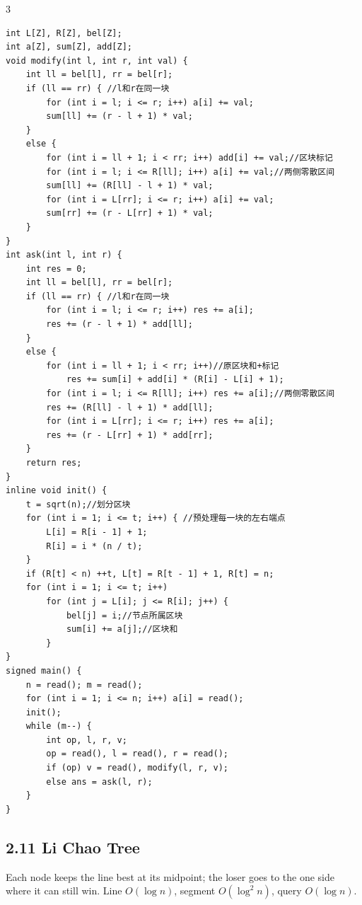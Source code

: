 \documentclass[8pt]{extarticle}
\begin{document}
\begin{multicols*}{3}
\begin{lstlisting}
int L[Z], R[Z], bel[Z];
int a[Z], sum[Z], add[Z];
void modify(int l, int r, int val) {
    int ll = bel[l], rr = bel[r];
    if (ll == rr) { //l和r在同一块
        for (int i = l; i <= r; i++) a[i] += val;
        sum[ll] += (r - l + 1) * val;
    }
    else {
        for (int i = ll + 1; i < rr; i++) add[i] += val;//区块标记
        for (int i = l; i <= R[ll]; i++) a[i] += val;//两侧零散区间
        sum[ll] += (R[ll] - l + 1) * val;
        for (int i = L[rr]; i <= r; i++) a[i] += val;
        sum[rr] += (r - L[rr] + 1) * val;
    }
}
int ask(int l, int r) {
    int res = 0;
    int ll = bel[l], rr = bel[r];
    if (ll == rr) { //l和r在同一块
        for (int i = l; i <= r; i++) res += a[i];
        res += (r - l + 1) * add[ll];
    }
    else {
        for (int i = ll + 1; i < rr; i++)//原区块和+标记
            res += sum[i] + add[i] * (R[i] - L[i] + 1);
        for (int i = l; i <= R[ll]; i++) res += a[i];//两侧零散区间
        res += (R[ll] - l + 1) * add[ll];
        for (int i = L[rr]; i <= r; i++) res += a[i];
        res += (r - L[rr] + 1) * add[rr];
    }
    return res;
}
inline void init() {
    t = sqrt(n);//划分区块
    for (int i = 1; i <= t; i++) { //预处理每一块的左右端点
        L[i] = R[i - 1] + 1;
        R[i] = i * (n / t);
    }
    if (R[t] < n) ++t, L[t] = R[t - 1] + 1, R[t] = n;
    for (int i = 1; i <= t; i++)
        for (int j = L[i]; j <= R[i]; j++) {
            bel[j] = i;//节点所属区块
            sum[i] += a[j];//区块和
        }
}
signed main() {
    n = read(); m = read();
    for (int i = 1; i <= n; i++) a[i] = read();
    init();
    while (m--) {
        int op, l, r, v;
        op = read(), l = read(), r = read();
        if (op) v = read(), modify(l, r, v);
        else ans = ask(l, r);
    }
}
\end{lstlisting}

\subsection*{2.11 Li Chao Tree}

Each node keeps the line best at its midpoint; the loser goes to the one side where it can still win. Line $O(\log n)$, segment $O(\log^2 n)$, query $O(\log n)$.



\end{multicols*}
\end{document}
